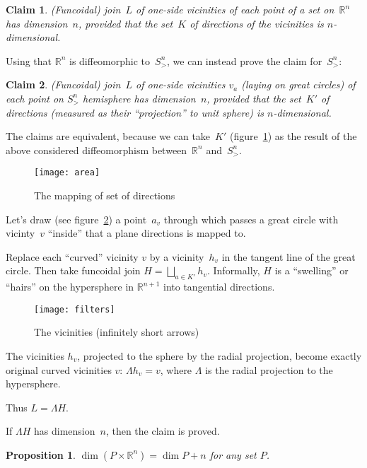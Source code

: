 \documentclass[oneside,draft]{amsart}
\newtheorem{prop}{Proposition}
\newtheorem{claim}{Claim}
\begin{document}
\begin{claim}
(Funcoidal) join~$L$ of one-si\-de vicinities of each point of a set on~$\mathbb{R}^n$ has dimension~$n$, provided that the set~$K$ of directions of the vicinities is $n$-di\-men\-sio\-nal.
\end{claim}

Using that $\mathbb{R}^n$ is diffeomorphic to~$S^n_{>}$, we can instead prove the claim for~$S^n_{>}$:

\begin{claim}
(Funcoidal) join~$L$ of one-si\-de vicinities $v_a$ (laying on great circles) of each point on $S^n_{>}$ hemisphere has dimension~$n$, provided that the set~$K'$ of directions (measured as their ``projection'' to unit sphere) is $n$-di\-men\-sio\-nal.
\end{claim}

The claims are equivalent, because we can take~$K'$ (figure~\ref{fig:area}) as the result of the above considered diffeomorphism between~$\mathbb{R}^n$ and~$S^n_{>}$.

\begin{figure}[hbt]
    \centering
    \texttt{[image: area]}
    \caption{The mapping of set of directions}
    \label{fig:area}
\end{figure}

Let's draw (see figure~\ref{fig:filters}) a point~$a_v$ through which passes a great circle with vicinty~$v$ ``inside'' that a plane directions is mapped to.

Replace each ``curved'' vicinity $v$ by a vicinity~$h_v$ in the tangent line of the great circle. Then take funcoidal join $H=\bigsqcup_{a\in K'}h_v$. Informally, $H$ is a ``swelling'' or ``hairs'' on the hypersphere in $\mathbb{R}^{n+1}$ into tangential directions.

\begin{figure}[hbt]
    \centering
    \texttt{[image: filters]}
    \caption{The vicinities (infinitely short arrows)}
    \label{fig:filters}
\end{figure}

The vicinities $h_v$, projected to the sphere by the radial projection, become exactly original curved vicinities $v$: $\Lambda h_v=v$, where $\Lambda$ is the radial projection to the hypersphere.

Thus $L = \Lambda H$.

If $\Lambda H$ has dimension~$n$, then the claim is proved.

\begin{prop}
$\dim(P\times\mathbb{R}^n) = \dim P + n$ for any set $P$.
\end{prop}
\end{document}

